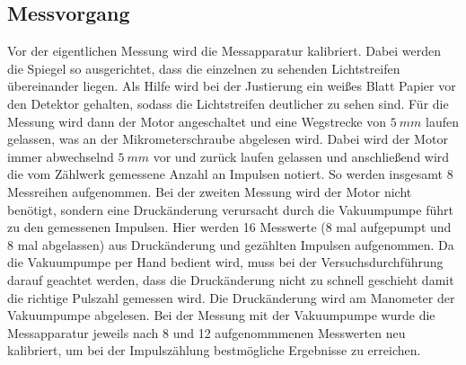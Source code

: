\subsection{Messvorgang}
Vor der eigentlichen Messung wird die Messapparatur kalibriert. Dabei werden die Spiegel
so ausgerichtet, dass die einzelnen zu sehenden Lichtstreifen übereinander liegen. Als
Hilfe wird bei der Justierung ein weißes Blatt Papier vor den Detektor gehalten, sodass
die Lichtstreifen deutlicher zu sehen sind. Für die Messung wird dann der Motor
angeschaltet und eine Wegstrecke von $\SI{5}{mm}$ laufen gelassen, was an der
Mikrometerschraube abgelesen wird. Dabei wird der Motor immer abwechselnd
$\SI{5}{mm}$ vor und zurück laufen gelassen und anschließend wird die vom Zählwerk gemessene Anzahl an Impulsen notiert. So werden insgesamt 8 Messreihen aufgenommen. \newline
\noindent
Bei der zweiten Messung wird der Motor nicht benötigt, sondern eine Druckänderung verursacht durch die Vakuumpumpe führt zu den gemessenen Impulsen.
Hier werden 16 Messwerte (8 mal aufgepumpt und 8 mal abgelassen) aus Druckänderung und gezählten Impulsen aufgenommen. Da die Vakuumpumpe per Hand bedient wird, muss bei der Versuchsdurchführung darauf geachtet werden, dass die Druckänderung nicht zu schnell geschieht damit die richtige Pulszahl gemessen wird. Die Druckänderung wird am Manometer der Vakuumpumpe abgelesen. Bei der Messung mit der Vakuumpumpe wurde die Messapparatur jeweils nach 8 und 12 aufgenommmenen Messwerten neu kalibriert, um bei der Impulszählung bestmögliche Ergebnisse zu erreichen. 

